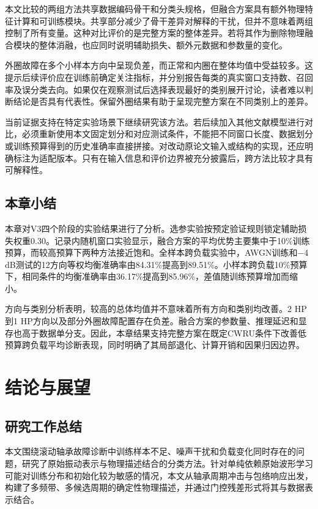 \documentclass[UTF8,12pt,openany,twoside]{ctexbook}
\numberwithin{equation}{chapter}
\begin{document}
本文比较的两组方法共享数据编码骨干和分类头规格，但融合方案具有额外物理特征计算和可训练模块。共享部分减少了骨干差异对解释的干扰，但并不意味着两组控制了所有变量。这种对比评价的是完整方案的整体差异。若将其作为删除物理融合模块的整体消融，也应同时说明辅助损失、额外元数据和参数量的变化。

外圈故障在多个小样本方向中呈现负差，而正常和内圈在整体均值中受益较多。这提示后续评价应在训练前确定关注指标，并分别报告每类的真实窗口支持数、召回率及误分类去向。如果仅在观察测试后选择表现最好的类别展开讨论，读者难以判断结论是否具有代表性。保留外圈结果有助于呈现完整方案在不同类别上的差异。

当前证据支持在特定实验场景下继续研究该方法。若后续加入其他文献模型进行对比，必须重新使用本文固定划分和对应测试条件，不能把不同窗口长度、数据划分或训练预算得到的历史准确率直接拼接。对改动原论文输入或结构的实现，还应明确标注为适配版本。只有在输入信息和评价边界被充分披露后，跨方法比较才具有可解释性。

\section{本章小结}\label{ux672cux7ae0ux5c0fux7ed3-3}

本章对V3四个阶段的实验结果进行了分析。选参实验按预定验证规则锁定辅助损失权重0.30。记录内随机窗口实验显示，融合方案的平均优势主要集中于10\%训练预算，而较高预算下两种方法接近饱和。全样本跨负载实验中，AWGN训练和−4 dB测试的12方向等权均衡准确率由84.31\%提高到89.51\%。小样本跨负载10\%预算下，相同条件的均衡准确率由36.17\%提高到85.96\%，差值随训练预算增加而缩小。

方向与类别分析表明，较高的总体均值并不意味着所有方向和类别均改善。2 HP到1 HP方向以及部分外圈故障配置存在负差。融合方案的参数量、推理延迟和显存也高于数据单分支。因此，本章结果支持完整方案在既定CWRU条件下改善低预算跨负载平均诊断表现，同时明确了其局部退化、计算开销和因果归因边界。

\chapter{结论与展望}\label{ux7b2c6ux7ae0-ux7ed3ux8bbaux4e0eux5c55ux671b}

\section{研究工作总结}\label{ux7814ux7a76ux5de5ux4f5cux603bux7ed3}

本文围绕滚动轴承故障诊断中训练样本不足、噪声干扰和负载变化同时存在的问题，研究了原始振动表示与物理描述结合的分类方法。针对单纯依赖原始波形学习可能对训练分布和初始化较为敏感的情况，本文从轴承周期冲击与包络响应出发，构建了多频带、多候选周期的确定性物理描述，并通过门控残差形式将其与数据表示结合。
\end{document}
